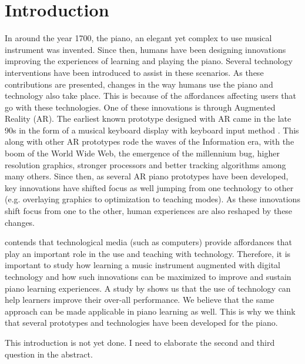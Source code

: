\documentclass[manuscript,screen]{acmart}
\begin{document}
\section{Introduction}
In around the year 1700, the piano, an elegant yet complex to use musical instrument was invented. Since then, humans have been designing innovations improving the experiences of learning and playing the piano. Several technology interventions have been introduced to assist in these scenarios. As these contributions are presented, changes in the way humans use the piano and technology also take place. This is because of the affordances affecting users that go with these technologies. One of these innovations is through Augmented Reality (AR). The earliest known prototype designed with AR came in the late 90s in the form of a musical keyboard display with keyboard input method \cite{breitweiser1996musical}. This along with other AR prototypes rode the waves of the Information era, with the boom of the World Wide Web, the emergence of the millennium bug, higher resolution graphics, stronger processors and better tracking algorithms among many others. Since then, as several AR piano prototypes have been developed, key innovations have shifted focus as well jumping from one technology to other (e.g. overlaying graphics to optimization to teaching modes). As these innovations shift focus from one to the other, human experiences are also reshaped by these changes. 

\citet{dede1996evolution} contends that technological media (such as computers) provide affordances that play an important role in the use and teaching with technology. Therefore, it is important to study how learning a music instrument augmented with digital technology and how such innovations can be maximized to improve and sustain piano learning experiences. A study by \citet{tamim2011forty} shows us that the use of technology can help learners improve their over-all performance. We believe that the same approach can be made applicable in piano learning as well. This is why we think that several prototypes and technologies have been developed for the piano. 

This introduction is not yet done. I need to elaborate the second and third question in the abstract. 
\end{document}
